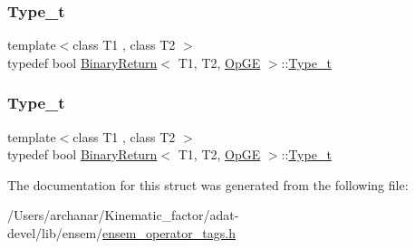 \mbox{\label{structBinaryReturn_3_01T1_00_01T2_00_01OpGE_01_4_a6bd095ff97c42640d8b1f733b75cf784}} 
\subsubsection{\texorpdfstring{Type\_t}{Type\_t}\hspace{0.1cm}{\footnotesize\ttfamily [2/3]}}
{\footnotesize\ttfamily template$<$class T1 , class T2 $>$ \\
typedef bool \mbox{\hyperlink{structBinaryReturn}{Binary\+Return}}$<$ T1, T2, \mbox{\hyperlink{structOpGE}{Op\+GE}} $>$\+::\mbox{\hyperlink{structBinaryReturn_3_01T1_00_01T2_00_01OpGE_01_4_a6bd095ff97c42640d8b1f733b75cf784}{Type\+\_\+t}}}

\mbox{\label{structBinaryReturn_3_01T1_00_01T2_00_01OpGE_01_4_a6bd095ff97c42640d8b1f733b75cf784}} 
\subsubsection{\texorpdfstring{Type\_t}{Type\_t}\hspace{0.1cm}{\footnotesize\ttfamily [3/3]}}
{\footnotesize\ttfamily template$<$class T1 , class T2 $>$ \\
typedef bool \mbox{\hyperlink{structBinaryReturn}{Binary\+Return}}$<$ T1, T2, \mbox{\hyperlink{structOpGE}{Op\+GE}} $>$\+::\mbox{\hyperlink{structBinaryReturn_3_01T1_00_01T2_00_01OpGE_01_4_a6bd095ff97c42640d8b1f733b75cf784}{Type\+\_\+t}}}



The documentation for this struct was generated from the following file\+:\begin{DoxyCompactItemize}
\item 
/\+Users/archanar/\+Kinematic\+\_\+factor/adat-\/devel/lib/ensem/\mbox{\hyperlink{adat-devel_2lib_2ensem_2ensem__operator__tags_8h}{ensem\+\_\+operator\+\_\+tags.\+h}}\end{DoxyCompactItemize}
